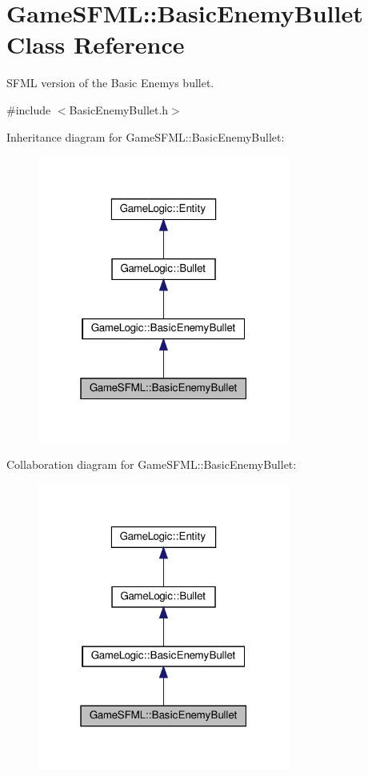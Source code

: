 \hypertarget{classGameSFML_1_1BasicEnemyBullet}{}\section{Game\+S\+F\+ML\+:\+:Basic\+Enemy\+Bullet Class Reference}
\label{classGameSFML_1_1BasicEnemyBullet}


S\+F\+ML version of the Basic Enemy\textquotesingle{}s bullet.  




{\ttfamily \#include $<$Basic\+Enemy\+Bullet.\+h$>$}



Inheritance diagram for Game\+S\+F\+ML\+:\+:Basic\+Enemy\+Bullet\+:
\nopagebreak
\begin{figure}[H]
\begin{center}
\leavevmode
\includegraphics[width=235pt]{classGameSFML_1_1BasicEnemyBullet__inherit__graph}
\end{center}
\end{figure}


Collaboration diagram for Game\+S\+F\+ML\+:\+:Basic\+Enemy\+Bullet\+:
\nopagebreak
\begin{figure}[H]
\begin{center}
\leavevmode
\includegraphics[width=235pt]{classGameSFML_1_1BasicEnemyBullet__coll__graph}
\end{center}
\end{figure}
